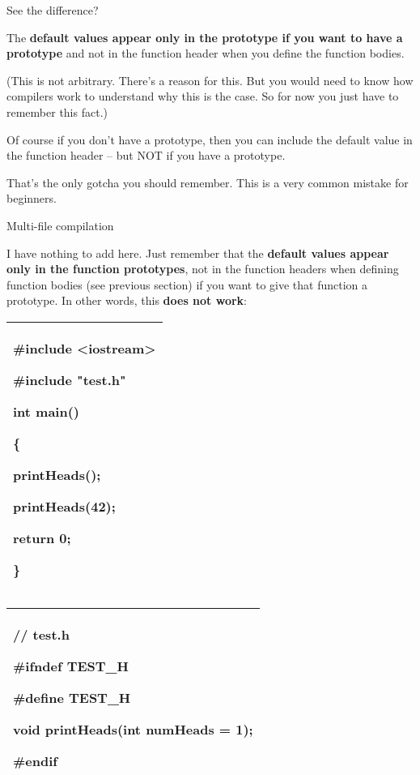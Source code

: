\documentclass[
]{article}
\begin{document}
See the difference?

The \textbf{default values appear only in the prototype if you want to
have a prototype }and not in the function header when you define the
function bodies.

(This is not arbitrary. There's a reason for this. But you would need to
know how compilers work to understand why this is the case. So for now
you just have to remember this fact.)

Of course if you don't have a prototype, then you can include the
default value in the function header -- but NOT if you have a prototype.

That's the only gotcha you should remember. This is a very common
mistake for beginners.

Multi-file compilation

I have nothing to add here. Just remember that the \textbf{default
values appear only in the function prototypes}, not in the function
headers when defining function bodies (see previous section) if you want
to give that function a prototype. In other words, this \textbf{does not
work}:

\begin{longtable}[]{@{}l@{}}
\toprule
\endhead
\begin{minipage}[t]{0.97\columnwidth}\raggedright
\#include \textless iostream\textgreater{}

\#include "test.h"

int main()

\{

printHeads();

printHeads(42);

return 0;

\}\strut
\end{minipage}\tabularnewline
\bottomrule
\end{longtable}

\begin{longtable}[]{@{}l@{}}
\toprule
\endhead
\begin{minipage}[t]{0.97\columnwidth}\raggedright
// test.h

\#ifndef TEST\_H

\#define TEST\_H

void printHeads(int numHeads = 1);

\#endif\strut
\end{minipage}\tabularnewline
\bottomrule
\end{longtable}
\end{document}

